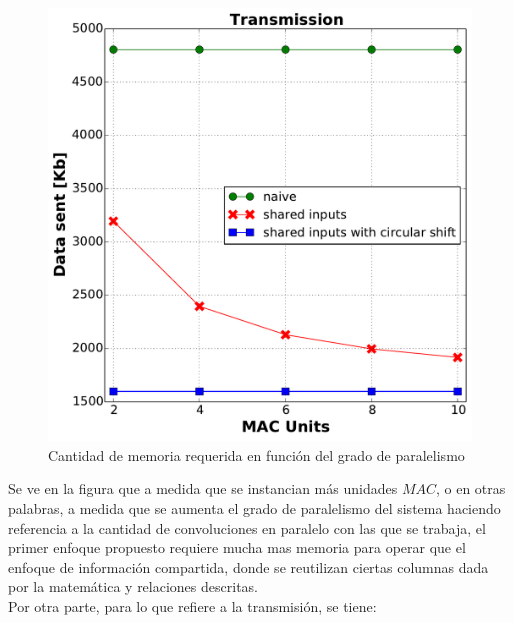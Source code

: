 \documentclass[a4paper]{article}
\begin{document}
\begin{figure}[H]
\centering
\includegraphics[scale=0.5]{data_sent}
\caption{Cantidad de memoria requerida en función del grado de paralelismo }
\label{memoryrequired}
\end{figure}

\bigskip
Se ve en la figura que a medida que se instancian más unidades $MAC$, o en otras palabras, a medida que se aumenta el grado de paralelismo del sistema haciendo referencia a la cantidad de convoluciones en paralelo con las que se trabaja, el primer enfoque propuesto requiere mucha mas memoria para operar que el enfoque de información compartida, donde se reutilizan ciertas columnas dada por la matemática y relaciones descritas.\\

\bigskip
\bigskip
Por otra parte, para lo que refiere a la transmisión, se tiene:
\end{document}
